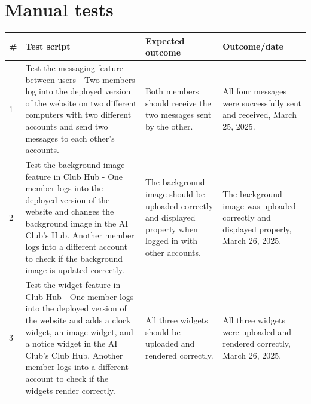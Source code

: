 \chapter{Manual tests}
\label{chap:manual-tests}

\begin{longtable}{| p{} | p{} | p{} | p{} |} 
\hline
\# & Test script & Expected outcome & Outcome/date \\ \hline
\endhead
1 & Test the messaging feature between users - Two members log into the deployed version of the website on two different computers with two different accounts and send two messages to each other's accounts.   & Both members should receive the two messages sent by the other. & All four messages were successfully sent and received, March 25, 2025. \\ \hline
2 & Test the background image feature in Club Hub - One member logs into the deployed version of the website and changes the background image in the AI Club's Hub. Another member logs into a different account to check if the background image is updated correctly.    & The background image should be uploaded correctly and displayed properly when logged in with other accounts. & The background image was uploaded correctly and displayed properly, March 26, 2025.  \\ \hline
3 & Test the widget feature in Club Hub - One member logs into the deployed version of the website and adds a clock widget, an image widget, and a notice widget in the AI Club's Club Hub. Another member logs into a different account to check if the widgets render correctly.  & All three widgets should be uploaded and rendered correctly. & All three widgets were uploaded and rendered correctly, March 26, 2025.  \\ \hline

\end{longtable}